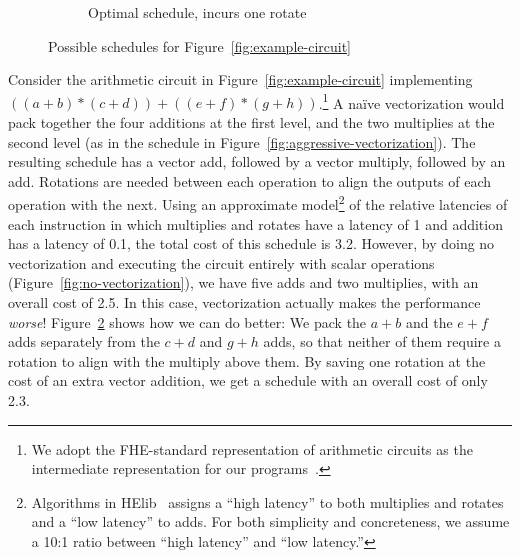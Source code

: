 \begin{figure}
\begin{subfigure}{0.8\columnwidth}
        \vspace{-1em}        
        \caption{Optimal schedule, incurs one rotate}\label{fig:optimal-schedule}
    \end{subfigure}
    \vspace{-1em}
    \caption{Possible schedules for Figure~\ref{fig:example-circuit}}
\end{figure}

%
Consider the arithmetic circuit in Figure~\ref{fig:example-circuit} implementing $((a + b) * (c + d)) + ((e + f) * (g + h))$.\footnote{We adopt the FHE-standard representation of arithmetic circuits as the intermediate representation for our programs~\cite{Gentry,CircuitRewriting,Ramparts,Porcupine}.}
A na\"ive vectorization would pack together the four additions at the first level, and the two multiplies at the second level (as in the schedule in Figure~\ref{fig:aggressive-vectorization}).
The resulting schedule has a vector add, followed by a vector multiply, followed by an add. Rotations are needed between each operation to align the outputs of each operation with the next.
Using an approximate model\footnote{Algorithms in HElib~\cite{AlgosHElib} assigns a ``high latency'' to both multiplies and rotates and a ``low latency'' to adds. For both simplicity and concreteness, we assume a 10:1 ratio between ``high latency'' and ``low latency.''} of the relative latencies of each instruction in which multiplies and rotates have a latency of 1 and addition has a latency of 0.1, the total cost of this schedule is 3.2.
However, by doing no vectorization and executing the circuit entirely with scalar operations (Figure~\ref{fig:no-vectorization}), we have five adds and two multiplies, with an overall cost of 2.5.
In this case, vectorization actually makes the performance {\em worse}!
Figure~\ref{fig:optimal-schedule} shows how we can do better:
We pack the $a+b$ and the $e+f$ adds separately from the $c+d$ and $g+h$ adds, so that neither of them require a rotation to align with the multiply above them.
By saving one rotation at the cost of an extra vector addition, we get a schedule with an overall cost of only 2.3.

